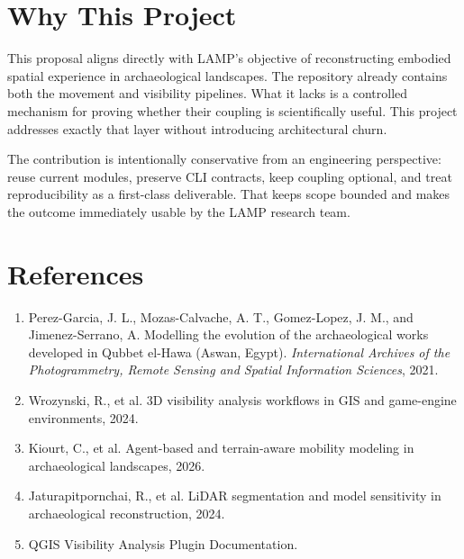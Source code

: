 \documentclass[11pt]{article}
\let\oldsection\section
\renewcommand{\section}{\clearpage\oldsection}
\begin{document}
\section{Why This Project}

This proposal aligns directly with LAMP's objective of reconstructing embodied spatial experience in archaeological landscapes. The repository already contains both the movement and visibility pipelines. What it lacks is a controlled mechanism for proving whether their coupling is scientifically useful. This project addresses exactly that layer without introducing architectural churn.

The contribution is intentionally conservative from an engineering perspective: reuse current modules, preserve CLI contracts, keep coupling optional, and treat reproducibility as a first-class deliverable. That keeps scope bounded and makes the outcome immediately usable by the LAMP research team.

\section{References}

\begin{enumerate}
  \item Perez-Garcia, J. L., Mozas-Calvache, A. T., Gomez-Lopez, J. M., and Jimenez-Serrano, A. Modelling the evolution of the archaeological works developed in Qubbet el-Hawa (Aswan, Egypt). \textit{International Archives of the Photogrammetry, Remote Sensing and Spatial Information Sciences}, 2021.
  \item Wrozynski, R., et al. 3D visibility analysis workflows in GIS and game-engine environments, 2024.
  \item Kiourt, C., et al. Agent-based and terrain-aware mobility modeling in archaeological landscapes, 2026.
  \item Jaturapitpornchai, R., et al. LiDAR segmentation and model sensitivity in archaeological reconstruction, 2024.
  \item QGIS Visibility Analysis Plugin Documentation.
\end{enumerate}
\end{document}
